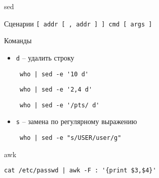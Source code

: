 \begin{frame}[fragile]{sed}
	\begin{block}{Сценарии}
		{\tt [ addr [ ,  addr ] ] cmd [ args ]}
	\end{block}

	\tiny
	\begin{block}{Команды}
		\begin{itemize}
		  \item {\tt d} -- удалить строку
			  \begin{verbatim} who | sed -e '10 d' \end{verbatim}
			  \begin{verbatim} who | sed -e '2,4 d' \end{verbatim}
			  \begin{verbatim} who | sed -e '/pts/ d' \end{verbatim}
		  \item {\tt s} -- замена по регулярному выражению
			  \begin{verbatim} who | sed -e "s/USER/user/g" \end{verbatim}
		\end{itemize}
	\end{block}
\end{frame}

\begin{frame}[fragile]{awk}
    \begin{lstlisting}
cat /etc/passwd | awk -F : '{print $3,$4}'
      \end{lstlisting}
\end{frame}
